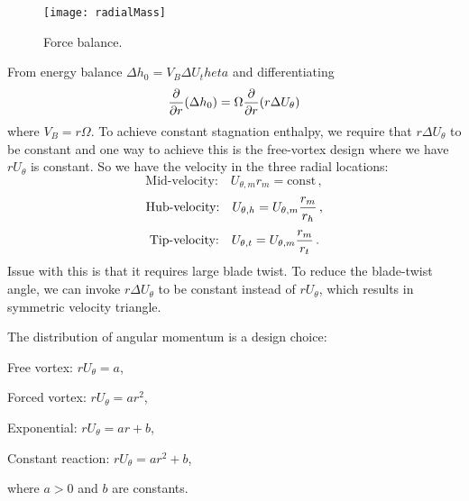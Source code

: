 \begin{figure}[!htb!]
 \centering
    {\texttt{[image: radialMass]}}
    \caption{\label{fig:radial_mass}Force balance.}
\end{figure}

From energy balance $\Delta h_0 = V_B \Delta U_theta$ and differentiating
\begin{equation}
  {\frac{\partial}{\partial r}} (\Delta h_0) = \Omega {\frac{\partial}{\partial r}} (r \Delta U_\theta)
\end{equation}
where $V_B = r \Omega$. To achieve constant stagnation enthalpy, we require that $r\Delta U_\theta$ to be constant and one way to achieve this is the free-vortex design where we have $r U_\theta$ is constant. So we have the velocity in the three radial locations:
\begin{equation}
  \text{Mid-velocity:} \quad U_{\theta, m} r_m = \text{const}\,,
\end{equation}
\begin{equation}
  \text{Hub-velocity:} \quad U_{\theta, h} = U_{\theta, m} {\frac{r_m}{r_h}}\,,
\end{equation}
\begin{equation}
  \text{Tip-velocity:} \quad U_{\theta, t} = U_{\theta, m} {\frac{r_m}{r_t}}\,.
\end{equation}
Issue with this is that it requires large blade twist. To reduce the blade-twist angle, we can invoke $r \Delta U_\theta$ to be constant instead of $r U_\theta$, which results in symmetric velocity triangle.

The distribution of angular momentum is a design choice:
\begin{itemizePacked}
\item Free vortex: $rU_\theta = a$,
\item Forced vortex: $rU_\theta = a r^2$,
\item Exponential: $rU_\theta = a r + b$,
\item Constant reaction: $rU_\theta = a r^2 + b$,
\end{itemizePacked}
where $a > 0$ and $b$ are constants.


